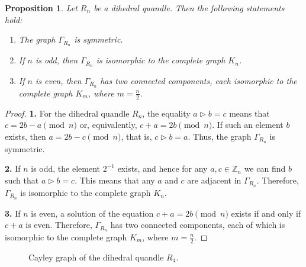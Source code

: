 \documentclass[english,11pt]{amsart}
\newtheorem{Proposition}[Theorem]{Proposition}
\begin{document}
\begin{Proposition}
\label{Prim_Dihed}
  Let $R_n$ be a dihedral quandle. Then the following statements hold:
\begin{enumerate}
\item 
 The graph $\Gamma_{R_n}$ is symmetric.
 \item 
If $n$ is odd, then $\Gamma_{R_n}$ is isomorphic to the complete graph $K_n$.
\item 
If $n$ is even, then $\Gamma_{R_n}$ has two connected components, each isomorphic to the complete graph $K_{m}$, where $m=\frac{n}{2}$.
\end{enumerate} 
\end{Proposition}
\begin{proof}
{\bf 1.} For the dihedral quandle $R_n$, the equality $a \rhd b = c$ means that 
$c = 2b - a  \pmod n$ or, equivalently, $c + a = 2b \pmod n$. 
If such an element $b$ exists, then 
$a = 2b - c  \pmod n$, that is, $c \rhd b = a$. 
Thus, the graph $\Gamma_{R_n}$ is symmetric.

{\bf 2.} If $n$ is odd, the element $2^{-1}$ exists, and hence for any 
$a, c \in \mathbb{Z}_n$ we can find $b$ such that $a \rhd b = c$. 
This means that any $a$ and $c$ are adjacent in $\Gamma_{R_n}$. 
Therefore, $\Gamma_{R_n}$ is isomorphic to the complete graph $K_n$.

{\bf 3.} If $n$ is even, a solution of the equation 
$c + a = 2b  \pmod n$ exists if and only if $c + a$ is even. 
Therefore, $\Gamma_{R_n}$ has two connected components, each of which is isomorphic to the complete graph $K_m$, where $m = \frac{n}{2}$.
\end{proof}


\begin{figure}[h]
\centering
{}

\caption{Cayley graph of the dihedral quandle $R_4$.
}

\end{figure}
\end{document}
